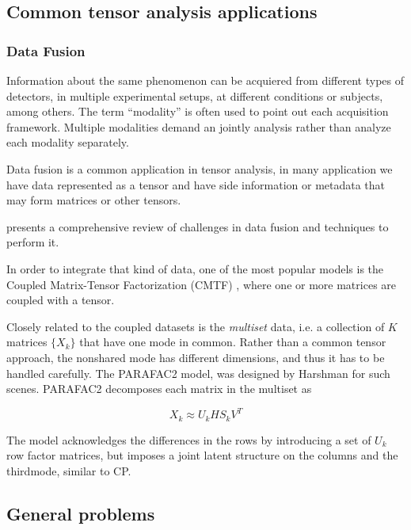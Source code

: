 \documentclass[letterpaper,12pt]{article}
\begin{document}
\subsection{Common tensor analysis applications}\label{sec:tensor_apps}


\subsubsection{Data Fusion}


Information about the same phenomenon can be acquiered from different types of detectors, in multiple experimental setups, at different  conditions or subjects, among others. The term ``modality'' is often used to point out each acquisition framework. Multiple modalities demand an jointly analysis rather than analyze each modality separately.

Data fusion is a common application in tensor analysis, in many application we have data represented as a tensor and have side information or metadata that may form matrices or other tensors.

\cite{Lahat2015} presents a comprehensive review of challenges in data fusion and techniques to perform it.

In order to integrate that kind of data, one of the most popular models is the Coupled Matrix-Tensor Factorization (CMTF) \cite{Acar2011}, where one or more matrices are coupled with a tensor.

Closely related to the coupled datasets is the \textit{multiset} data, i.e. a collection of $K$ matrices $\{X_k\}$ that have one mode in common. Rather than a common tensor approach, the nonshared mode has different dimensions, and thus it has to be handled carefully. The PARAFAC2 model, was designed by Harshman \cite{Harshman1970} for such scenes. PARAFAC2 decomposes each matrix in the multiset as

$$X_k\approx U_kHS_kV^T$$

The model acknowledges the differences in the rows by introducing a set of $U_k$ row factor matrices, but imposes a joint latent structure on the columns and the thirdmode, similar to CP.

\subsection{General problems}

\end{document}
